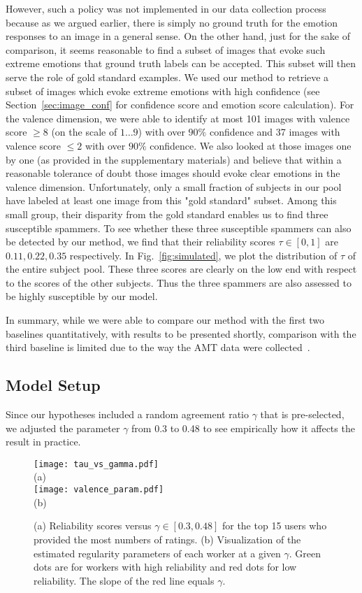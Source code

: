 \documentclass[10pt,journal,letterpaper,compsoc,twoside]{IEEEtran}
\begin{document}
{However, such a policy was not implemented in our data collection process because as we argued earlier, there is simply no ground truth for the emotion responses to an image in a general sense.  On the other hand, just for the sake of comparison, it seems reasonable to find a subset of images that evoke such extreme emotions that ground truth labels can be accepted. This subset will then serve the role of gold standard examples. 
We used our method to retrieve a subset of images which evoke extreme emotions
with high confidence (see Section~\ref{sec:image_conf} for confidence score and emotion score calculation). For the valence dimension,
we were able to identify at most 101 images with valence score $\ge 8$ (on the scale of $1\ldots 9$) with over $90\%$ confidence and 37
images with valence score $\le 2$ with over $90\%$ confidence. We also looked at those images one by one
(as provided in the supplementary materials) and believe that within a reasonable tolerance of doubt those images should evoke clear emotions in the valence dimension. 
Unfortunately, only a small fraction of subjects in our pool have labeled at least one image from this "gold standard" subset.
Among this small group, their disparity from the gold standard enables us to find three susceptible spammers. To see whether these three susceptible spammers can also be detected by our method, we find that their reliability scores $\tau\in[0,1]$ are $0.11, 0.22, 0.35$ respectively. In Fig.~\ref{fig:simulated}, we plot the distribution of $\tau$ of the entire subject pool. These three scores are clearly on the low end with respect to the scores of the other subjects. Thus the three spammers are also assessed to be highly susceptible by our model.}

{In summary, while we were able to compare our method with the first two baselines quantitatively, with results to be presented shortly, 
comparison with the third baseline is limited
due to the way the AMT data were collected~\cite{xin2016}.}

\subsection{Model Setup}
Since our hypotheses included a random agreement ratio $\gamma$ that is pre-selected, we adjusted the parameter $\gamma$ from 0.3 to 0.48 to
see empirically how it affects the result in practice. 

\begin{figure}[ht!]
\centering
\texttt{[image: tau\_vs\_gamma.pdf]}\\[-.4cm]
(a)\\
\texttt{[image: valence\_param.pdf]}\\[-.4cm]
(b)
\caption{(a) Reliability scores versus $\gamma\in [0.3, 0.48]$ for the top 15 users who provided the most numbers of ratings. 
(b) Visualization of 
the estimated regularity parameters of each worker at a given $\gamma$. Green dots are for workers with high reliability and 
red dots for low reliability. The slope of the red line equals $\gamma$. }
\label{fig:labelers}
\end{figure}
\end{document}
